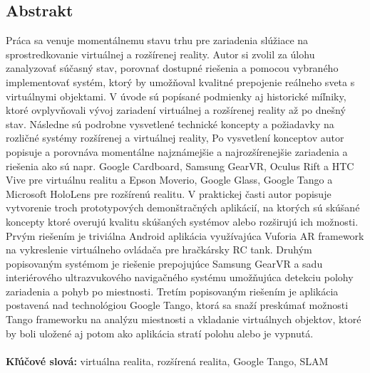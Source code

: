 \documentclass[12pt, a4paper]{article}
\begin{document}
\begin{titlepage}
\section*{Abstrakt}
Práca sa venuje momentálnemu stavu trhu pre zariadenia slúžiace na sprostredkovanie virtuálnej a rozšírenej reality. Autor si zvolil za úlohu zanalyzovať súčasný stav, porovnať dostupné riešenia a pomocou vybraného implementovať systém, ktorý by umožňoval kvalitné prepojenie reálneho sveta s virtuálnymi objektami. V úvode sú popísané podmienky aj historické míľniky, ktoré ovplyvňovali vývoj zariadení virtuálnej a rozšírenej reality až po dnešný stav. Následne sú podrobne vysvetlené technické koncepty a požiadavky na rozličné systémy rozšírenej a virtuálnej reality, Po vysvetlení konceptov autor popisuje a porovnáva momentálne najznámejšie a najrozšírenejšie zariadenia a riešenia ako sú napr. Google Cardboard, Samsung GearVR, Oculus Rift a HTC Vive pre virtuálnu realitu a Epson Moverio, Google Glass, Google Tango a Microsoft HoloLens pre rozšírenú realitu. V praktickej časti autor popisuje vytvorenie troch prototypových demonštračných aplikácií, na ktorých sú skúšané koncepty ktoré overujú kvalitu skúšaných systémov alebo rozširujú ich možnosti. Prvým riešením je triviálna Android aplikácia využívajúca Vuforia AR framework na vykreslenie virtuálneho ovládača pre hračkársky RC tank. Druhým popisovaným systémom je riešenie prepojujúce Samsung GearVR a sadu interiérového ultrazvukového navigačného systému umožňujúca detekciu polohy zariadenia a pohyb po miestnosti. Tretím popisovaným riešením je aplikácia postavená nad technológiou Google Tango, ktorá sa snaží preskúmať možnosti Tango frameworku na analýzu miestnosti a vkladanie virtuálnych objektov, ktoré by boli uložené aj potom ako aplikácia stratí polohu alebo je vypnutá.\\ \\
\textbf{Kľúčové slová:} virtuálna realita, rozšírená realita, Google Tango, SLAM
\end{titlepage}
\end{document}
